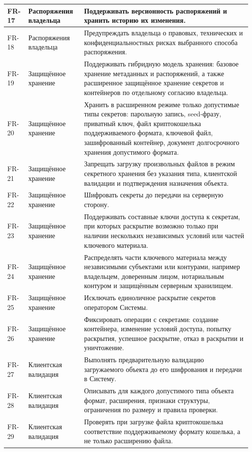 \begin{longtable}{|P{1.45cm}|P{3.35cm}|P{10.7cm}|}
FR-17 & Распоряжения владельца & Поддерживать версионность распоряжений и хранить историю их изменения.\\ \hline
FR-18 & Распоряжения владельца & Предупреждать владельца о правовых, технических и конфиденциальностных рисках выбранного способа распоряжения.\\ \hline
FR-19 & Защищённое хранение & Поддерживать гибридную модель хранения: базовое хранение метаданных и распоряжений, а также расширенное защищённое хранение секретов и контейнеров по отдельному согласию владельца.\\ \hline
FR-20 & Защищённое хранение & Хранить в расширенном режиме только допустимые типы секретов: парольную запись, seed-фразу, приватный ключ, файл криптокошелька поддерживаемого формата, ключевой файл, зашифрованный контейнер, документ долгосрочного хранения допустимого формата.\\ \hline
FR-21 & Защищённое хранение & Запрещать загрузку произвольных файлов в режим секретного хранения без указания типа, клиентской валидации и подтверждения назначения объекта.\\ \hline
FR-22 & Защищённое хранение & Шифровать секреты до передачи на серверную сторону.\\ \hline
FR-23 & Защищённое хранение & Поддерживать составные ключи доступа к секретам, при которых раскрытие возможно только при наличии нескольких независимых условий или частей ключевого материала.\\ \hline
FR-24 & Защищённое хранение & Распределять части ключевого материала между независимыми субъектами или контурами, например владельцем, доверенным лицом, нотариальным контуром и защищённым серверным хранилищем.\\ \hline
FR-25 & Защищённое хранение & Исключать единоличное раскрытие секретов оператором Системы.\\ \hline
FR-26 & Защищённое хранение & Фиксировать операции с секретами: создание контейнера, изменение условий доступа, попытку раскрытия, успешное раскрытие, отказ в раскрытии и уничтожение.\\ \hline
FR-27 & Клиентская валидация & Выполнять предварительную валидацию загружаемого объекта до его шифрования и передачи в Систему.\\ \hline
FR-28 & Клиентская валидация & Описывать для каждого допустимого типа объекта формат, расширения, признаки структуры, ограничения по размеру и правила проверки.\\ \hline
FR-29 & Клиентская валидация & Проверять при загрузке файла криптокошелька соответствие поддерживаемому формату кошелька, а не только расширению файла.\\ \hline

\end{longtable}
